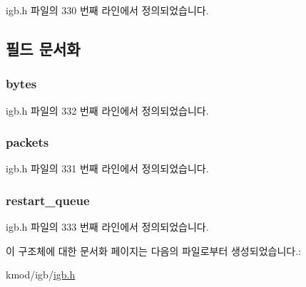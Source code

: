 igb.\+h 파일의 330 번째 라인에서 정의되었습니다.



\subsection{필드 문서화}
\subsubsection[{\texorpdfstring{bytes}{bytes}}]{ bytes}\hypertarget{structigb__tx__queue__stats_a1b0587fe9418ec065eee9e7593528b12}{}\label{structigb__tx__queue__stats_a1b0587fe9418ec065eee9e7593528b12}


igb.\+h 파일의 332 번째 라인에서 정의되었습니다.

\subsubsection[{\texorpdfstring{packets}{packets}}]{ packets}\hypertarget{structigb__tx__queue__stats_ae5fef1d76642baa9a22fafc8c04907c5}{}\label{structigb__tx__queue__stats_ae5fef1d76642baa9a22fafc8c04907c5}


igb.\+h 파일의 331 번째 라인에서 정의되었습니다.

\subsubsection[{\texorpdfstring{restart\+\_\+queue}{restart_queue}}]{ restart\+\_\+queue}\hypertarget{structigb__tx__queue__stats_af4a2d173ec4fcd7b2bf5a7b8e51e2fcd}{}\label{structigb__tx__queue__stats_af4a2d173ec4fcd7b2bf5a7b8e51e2fcd}


igb.\+h 파일의 333 번째 라인에서 정의되었습니다.



이 구조체에 대한 문서화 페이지는 다음의 파일로부터 생성되었습니다.\+:\begin{DoxyCompactItemize}
\item 
kmod/igb/\hyperlink{kmod_2igb_2igb_8h}{igb.\+h}\end{DoxyCompactItemize}
